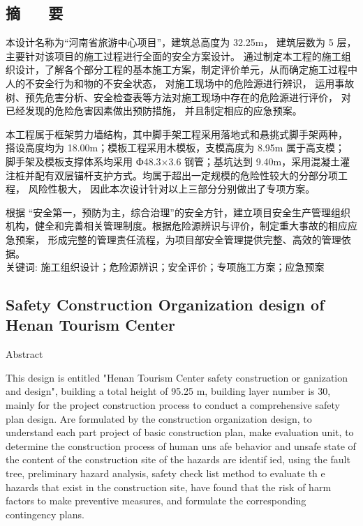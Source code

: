 \begin{center}
\section*{  \textbf{摘 ~~ 要}}
\end{center}

\vskip0.5cm
本设计名称为“河南省旅游中心项目”，建筑总高度为 32.25m， 建筑层数为 5  层，主要针对该项目的施工过程进行全面的安全方案设计。
通过制定本工程的施工组织设计，了解各个部分工程的基本施工方案，制定评价单元，从而确定施工过程中人的不安全行为和物的不安全状态，
对施工现场中的危险源进行辨识， 运用事故树、预先危害分析、安全检查表等方法对施工现场中存在的危险源进行评价， 对已经发现的危险危害因素做出预防措施，
并且制定相应的应急预案。

本工程属于框架剪力墙结构，其中脚手架工程采用落地式和悬挑式脚手架两种， 搭设高度均为 18.00m；模板工程采用木模板，支模高度为 8.95m 属于高支模；
脚手架及模板支撑体系均采用 Ф48.3×3.6 钢管；基坑达到 9.40m，采用混凝土灌注桩并配有双层锚杆支护方式。均属于超出一定规模的危险性较大的分部分项工程，
风险性极大， 因此本次设计针对以上三部分分别做出了专项方案。

根据 “安全第一，预防为主，综合治理”的安全方针，建立项目安全生产管理组织机构，健全和完善相关管理制度。根据危险源辨识与评价，制定重大事故的相应应急预案，
形成完整的管理责任流程，为项目部安全管理提供完整、高效的管理依据。\\



{ \heiti 关键词: 施工组织设计；危险源辨识；安全评价；专项施工方案；应急预案}
\pagestyle{fancy}

\clearpage
\begin{center}
    \section*{  \textbf{Safety Construction Organization design of Henan Tourism Center}}
     Abstract
    \end{center}


   This design is entitled "Henan Tourism Center safety construction or ganization and design", building a total height of 95.25 m, building layer number is 30, 
   mainly for the project construction process to conduct a comprehensive safety plan design. Are formulated by the construction organization design, 
   to understand each part project of basic construction plan, make evaluation unit, to determine the construction process of human uns afe behavior 
   and unsafe state of the content of the construction site of the hazards are identif ied, using the fault tree, preliminary hazard analysis, safety 
   check list method to evaluate th e hazards that exist in the construction site, have found that the risk of harm factors to make preventive measures,
    and formulate the corresponding contingency plans.


